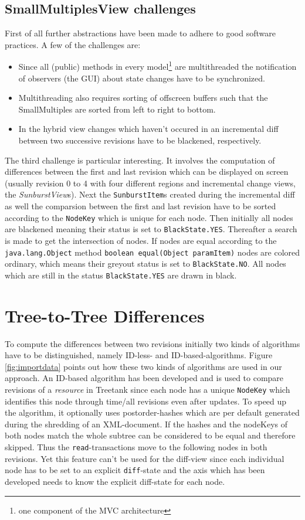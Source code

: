\documentclass{llncs}
\begin{document}
\subsection{SmallMultiplesView challenges}
First of all further abstractions have been made to adhere to good software practices. A few of the challenges are:

\begin{itemize}
\item Since all (public) methods in every model\footnote{one component of the MVC architecture} are multithreaded the notification of observers (the GUI) about state changes have to be synchronized.
\item Multithreading also requires sorting of offscreen buffers such that the SmallMultiples are sorted from left to right to bottom.
\item In the hybrid view changes which haven't occured in an incremental diff between two successive revisions have to be blackened, respectively.
\end{itemize}

The third challenge is particular interesting. It involves the computation of differences between the first and last revision which can be displayed on screen (usually revision 0 to 4 with four different regions and incremental change views, the \emph{SunburstView}s). Next the \texttt{SunburstItem}s created during the incremental diff as well the comparsion between the first and last revision have to be sorted according to the \texttt{NodeKey} which is unique for each node. Then initially all nodes are blackened meaning their status is set to \texttt{BlackState.YES}. Thereafter a search is made to get the intersection of nodes. If nodes are equal according to the \texttt{java.lang.Object} method \texttt{boolean equal(Object paramItem)} nodes are colored ordinary, which means their greyout status is set to \texttt{BlackState.NO}. All nodes which are still in the status \texttt{BlackState.YES} are drawn in black.

\section{Tree-to-Tree Differences}
To compute the differences between two revisions initially two kinds of algorithms have to be distinguished, namely ID-less- and ID-based-algorithms. Figure \ref{fig:importdata} points out how these two kinds of algorithms are used in our approach. An ID-based algorithm has been developed and is used to compare revisions of a \emph{resource} in Treetank since each node has a unique \texttt{NodeKey} which identifies this node through time/all revisions even after updates. To speed up the algorithm, it optionally uses postorder-hashes which are per default generated during the shredding of an XML-document. If the hashes and the nodeKeys of both nodes match the whole subtree can be considered to be equal and therefore skipped. Thus the \texttt{read}-transactions move to the following nodes in both revisions. Yet this feature can't be used for the diff-view since each individual node has to be set to an explicit \texttt{diff}-state and the axis which has been developed needs to know the explicit diff-state for each node.
\end{document}
